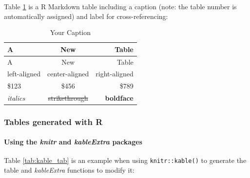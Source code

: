 \documentclass[
11pt,
a4paper]{article}
\begin{document}
Table \ref{tab:rmd_tab} is a R Markdown table including a caption (note:
the table number is automatically assigned) and label for
cross-referencing:

\begin{longtable}[]{@{}lcr@{}}
\caption{Your Caption \label{tab:rmd_tab}}\tabularnewline
\toprule\noalign{}
A & New & Table \\
\midrule\noalign{}
\endfirsthead
\toprule\noalign{}
A & New & Table \\
\midrule\noalign{}
\endhead
\bottomrule\noalign{}
\endlastfoot
left-aligned & center-aligned & right-aligned \\
\$123 & \$456 & \$789 \\
\emph{italics} & \st{strikethrough} & \textbf{boldface} \\
\end{longtable}

\hypertarget{tables-generated-with-r}{%
\subsubsection{Tables generated with R}\label{tables-generated-with-r}}

\hypertarget{using-the-knitr-and-kableextra-packages}{%
\paragraph{\texorpdfstring{Using the \emph{knitr} and \emph{kableExtra}
packages}{Using the knitr and kableExtra packages}}\label{using-the-knitr-and-kableextra-packages}}

Table \ref{tab:kable_tab} is an example when using
\texttt{knitr::kable()} to generate the table and \emph{kableExtra}
functions to modify it:
\end{document}
